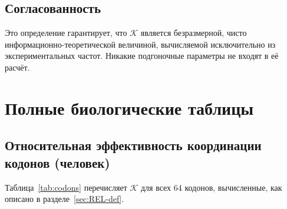 \documentclass[12pt,a4paper]{article}
\newcommand{\REL}{\mathcal{K}}          %
\begin{document}
	\subsection{Согласованность}
	Это определение гарантирует, что \(\REL\) является безразмерной, чисто информационно-теоретической величиной, вычисляемой исключительно из экспериментальных частот. Никакие подгоночные параметры не входят в её расчёт.
	
	\section{Полные биологические таблицы}
	\label{sec:tables}
	
	\subsection{Относительная эффективность координации кодонов (человек)}
	\label{sec:codons}
	Таблица~\ref{tab:codons} перечисляет \(\REL\) для всех 64 кодонов, вычисленные, как описано в разделе~\ref{sec:REL-def}.
	
\end{document}
